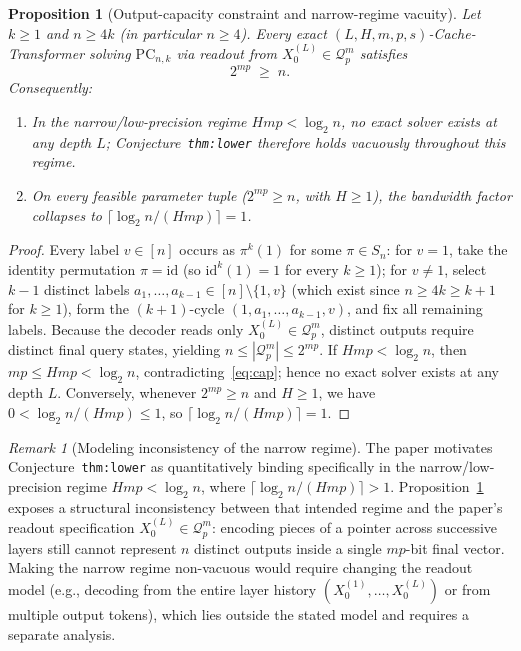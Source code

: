 \documentclass[11pt]{article}
\theoremstyle{plain}
\newtheorem{proposition}[theorem]{Proposition}
\theoremstyle{definition}
\theoremstyle{remark}
\newtheorem{remark}{Remark}
\newcommand{\PC}{\mathrm{PC}}
\begin{document}
\begin{proposition}[Output-capacity constraint and narrow-regime vacuity]\label{prop:cap}
Let $k \ge 1$ and $n \ge 4k$ (in particular $n \ge 4$). Every exact $(L, H, m, p, s)$-Cache-Transformer solving $\PC_{n,k}$ via readout from $X^{(L)}_0 \in \mathcal{Q}_p^m$ satisfies
\begin{equation}\label{eq:cap}
2^{mp} \;\ge\; n.
\end{equation}
Consequently:
\begin{enumerate}[label=\textup{(\arabic*)},itemsep=2pt]
\item In the narrow/low-precision regime $Hmp < \log_2 n$, no exact solver exists at any depth $L$; Conjecture~\texttt{thm:lower} therefore holds vacuously throughout this regime.
\item On every feasible parameter tuple ($2^{mp} \ge n$, with $H \ge 1$), the bandwidth factor collapses to $\lceil \log_2 n / (Hmp) \rceil = 1$.
\end{enumerate}
\end{proposition}

\begin{proof}
Every label $v \in [n]$ occurs as $\pi^k(1)$ for some $\pi \in S_n$: for $v = 1$, take the identity permutation $\pi = \mathrm{id}$ (so $\mathrm{id}^k(1) = 1$ for every $k \ge 1$); for $v \neq 1$, select $k - 1$ distinct labels $a_1, \dots, a_{k-1} \in [n] \setminus \{1, v\}$ (which exist since $n \ge 4k \ge k + 1$ for $k \ge 1$), form the $(k+1)$-cycle $(1, a_1, \dots, a_{k-1}, v)$, and fix all remaining labels.
Because the decoder reads only $X^{(L)}_0 \in \mathcal{Q}_p^m$, distinct outputs require distinct final query states, yielding $n \le |\mathcal{Q}_p^m| \le 2^{mp}$.
If $Hmp < \log_2 n$, then $mp \le Hmp < \log_2 n$, contradicting~\eqref{eq:cap}; hence no exact solver exists at any depth $L$.
Conversely, whenever $2^{mp} \ge n$ and $H \ge 1$, we have $0 < \log_2 n / (Hmp) \le 1$, so $\lceil \log_2 n / (Hmp) \rceil = 1$.
\end{proof}

\begin{remark}[Modeling inconsistency of the narrow regime]
The paper motivates Conjecture~\texttt{thm:lower} as quantitatively binding specifically in the narrow/low-precision regime $Hmp < \log_2 n$, where $\lceil \log_2 n / (Hmp) \rceil > 1$.
Proposition~\ref{prop:cap} exposes a structural inconsistency between that intended regime and the paper's readout specification $X^{(L)}_0 \in \mathcal{Q}_p^m$: encoding pieces of a pointer across successive layers still cannot represent $n$ distinct outputs inside a single $mp$-bit final vector.
Making the narrow regime non-vacuous would require changing the readout model (e.g., decoding from the entire layer history $(X^{(1)}_0, \dots, X^{(L)}_0)$ or from multiple output tokens), which lies outside the stated model and requires a separate analysis.
\end{remark}
\end{document}
